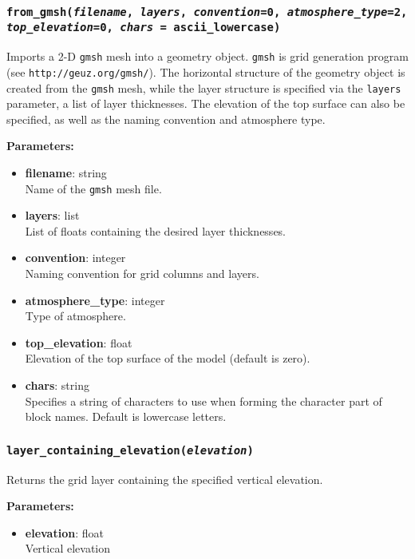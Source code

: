 \subsubsection{\texttt{from\_gmsh(\emph{filename}, \emph{layers}, \emph{convention}=0, \emph{atmosphere\_type}=2,\\
    \emph{top\_elevation}=0, \emph{chars} = ascii\_lowercase)}}
\label{sec:from_gmsh}

Imports a 2-D \texttt{gmsh} mesh into a geometry object.  \texttt{gmsh} is grid generation program (see \texttt{http://geuz.org/gmsh/}).  The horizontal structure of the geometry object is created from the \texttt{gmsh} mesh, while the layer structure is specified via the \texttt{layers} parameter, a list of layer thicknesses.  The elevation of the top surface can also be specified, as well as the naming convention and atmosphere type.

\textbf{Parameters:}
\begin{itemize}
\item \textbf{filename}: string\\
  Name of the \texttt{gmsh} mesh file.
\item \textbf{layers}: list\\
  List of floats containing the desired layer thicknesses.
\item \textbf{convention}: integer\\
  Naming convention for grid columns and layers.
\item \textbf{atmosphere\_type}: integer\\
  Type of atmosphere.
\item \textbf{top\_elevation}: float\\
  Elevation of the top surface of the model (default is zero).
\item \textbf{chars}: string\\
  Specifies a string of characters to use when forming the character part of block names.  Default is lowercase letters.
\end{itemize}

\subsubsection{\texttt{layer\_containing\_elevation(\emph{elevation})}}
\label{sec:layer_containing_elevation}

Returns the grid layer containing the specified vertical elevation.

\textbf{Parameters:}
\begin{itemize}
\item \textbf{elevation}: float\\
  Vertical elevation
\end{itemize}

